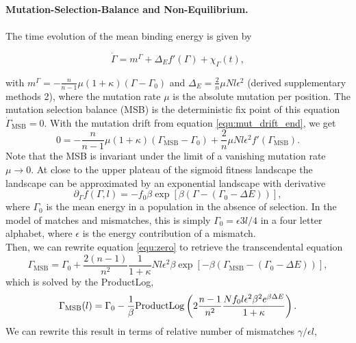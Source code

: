 \textbf{Mutation-Selection-Balance and Non-Equilibrium.}\\ \\
The time evolution of the mean binding energy is given by \cite{held_survival_2019}

\begin{equation}
	\dot{\Gamma}=m^\Gamma+\Delta_E f'(\Gamma)+\chi_\Gamma(t),
\end{equation}

\noindent with $m^\Gamma = -\frac{n}{n-1}\mu(1+\kappa) (\Gamma - \Gamma_0)$ and $\Delta_E = \frac{2}{n}\mu Nl\epsilon^2$ (derived supplementary methods 2), where the mutation rate $\mu$ is the absolute mutation per position. The mutation selection balance (MSB) is the deterministic fix point of this equation $\dot{\Gamma}_{\mathrm{MSB}}=0$. With the mutation drift from equation \ref{equ:mut_drift_end}, we get
\begin{equation}
	0=-\frac{n}{n-1}\mu\left(1+\kappa\right)\left(\Gamma_{\mathrm{MSB}}-\Gamma_0\right)+\frac{2}{n}\mu N l \epsilon^2 f'(\Gamma_{\mathrm{MSB}}).
	\label{equ:zero}
\end{equation}
Note that the MSB is invariant under the limit of a vanishing mutation rate $\mu\rightarrow0$. At close to the upper plateau of the sigmoid fitness 
landscape the landscape can be approximated by an exponential landscape with derivative
\begin{equation}
\partial_\Gamma f(\Gamma, l) = -f_0\beta\exp\left[ \beta (\Gamma- (\Gamma_0-\Delta E ))\right],
\end{equation}
where $\Gamma_0$ is the mean energy in a population in the absence of selection. In the model of matches and mismatches, this is simply 
$\Gamma_0=\epsilon 3l/4$ in a four letter alphabet, where $\epsilon$ is the energy contribution of a mismatch.\\
Then, we can rewrite equation \ref{equ:zero} to retrieve the transcendental equation
\begin{equation}
	\Gamma_\mathrm{MSB}=\Gamma_0+\frac{2(n-1)}{n^2}\frac{1}{1+\kappa}Nl\epsilon^2\beta\exp\left[-\beta (\Gamma_\mathrm{MSB} -(\Gamma_0-\Delta E) )\right],
\end{equation}
which is solved by the ProductLog,
\begin{equation}
	\Gamma_\mathrm{MSB}(l)=\Gamma_0 - \frac{1}{\beta}\mathrm{ProductLog}\left(2 \frac{n-1}{n^2}\frac{ N f_0 l \epsilon^2 \beta^2e^{\beta\Delta E}}{1+\kappa}\right)\label{equ:msb_solution}.
\end{equation}
We can rewrite this result in terms of relative number of mismatches $\gamma/\epsilon l$,
